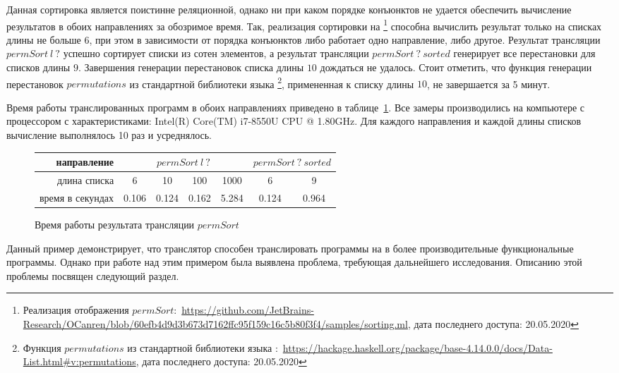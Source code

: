 Данная сортировка является поистинне реляционной, однако ни при каком порядке конъюнктов не удается обеспечить вычисление результатов в обоих направлениях за обозримое время.
Так, реализация сортировки на \ocanren{}\footnote{Реализация отображения $permSort$:~\url{https://github.com/JetBrains-Research/OCanren/blob/60efb4d9d3b673d7162ffc95f159c16c5b80f3f4/samples/sorting.ml}, дата последнего доступа: 20.05.2020} способна вычислить результат только на списках длины не больше $6$, при этом в зависимости от порядка конъюнктов либо работает одно направление, либо другое.
Результат трансляции $permSort \ l \ ?$ успешно сортирует списки из сотен элементов, а результат трансляции $permSort \ ? \ sorted$ генерирует все перестановки для списков длины $9$.
Завершения генерации перестановок списка длины $10$ дождаться не удалось.
Стоит отметить, что функция генерации перестановок $permutations$ из стандартной библиотеки языка \haskell{}\footnote{Функция $permutations$ из стандартной библиотеки языка \haskell{}:~\url{https://hackage.haskell.org/package/base-4.14.0.0/docs/Data-List.html\#v:permutations}, дата последнего доступа: 20.05.2020}, примененная к списку длины $10$, не завершается за 5 минут.

Время работы транслированных программ в обоих направлениях приведено в таблице~\ref{tab:sort}.
Все замеры производились на компьютере с процессором с характеристиками: Intel(R) Core(TM) i7-8550U CPU @ 1.80GHz.
Для каждого направления и каждой длины списков вычисление выполнялось 10 раз и усреднялось.

\begin{figure}[h!]
\begin{center}
\begin{tabular}{|r|c|c|c|c||c|c|}
      \hline
      направление & \multicolumn{4}{|c||}{$permSort \ l \ ?$} & \multicolumn{2}{|c|}{$permSort \ ? \ sorted$}  \tabularnewline
      \hline
длина списка & 6 & 10 & 100 & 1000 & 6 & 9 \\ \hline
время в секундах & 0.106 & 0.124 & 0.162 & 5.284 & 0.124 & 0.964 \\
      \hline
\end{tabular}
\caption{Время работы результата трансляции $permSort$}
\label{tab:sort}
\end{center}
\end{figure}

Данный пример демонстрирует, что транслятор способен транслировать программы на \miniKanren{} в более производительные функциональные программы.
Однако при работе над этим примером была выявлена проблема, требующая дальнейшего исследования.
Описанию этой проблемы посвящен следующий раздел.

